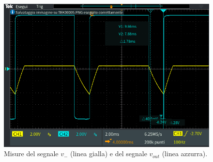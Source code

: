 \begin{figure}[h]
	\centering
	\includegraphics[width=\linewidth]{./ImageFiles/Laboratorio 4/TEK00006.PNG}
	\caption{Misure del segnale $v_{-}$ (linea gialla) e del segnale $v_{out}$ (linea azzurra).}
	\label{fig:calcolo_ta}
\end{figure}


